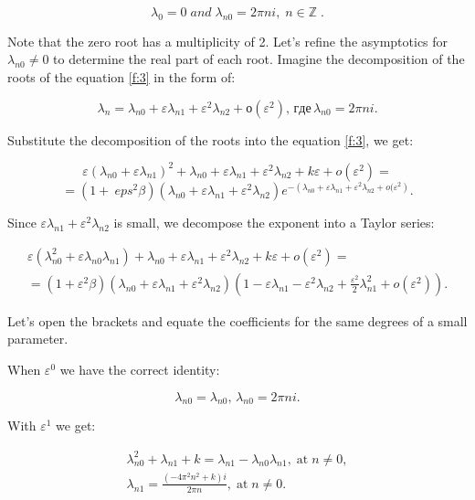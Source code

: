 \documentclass[12pt]{article} %
\newcommand{\eps}{\varepsilon}
\begin{document}
\[
\lambda_{0}=0\;and\;\lambda_{n0}=2\pi ni,\;n\in\mathbb{Z}\;.
\]

Note that the zero root has a multiplicity of 2. Let's refine the asymptotics for $\lambda_{n0}\neq0$ to determine the real part of each root. Imagine the decomposition of the roots of the equation \eqref{f:3} in the form of:

\[
\lambda_n=\lambda_{n0}+ \varepsilon\lambda_{n1}+\varepsilon^{2}\lambda_{n2}+о(\varepsilon^{2}),\, где\, \lambda_{n0}=2\pi n i.
\]

Substitute the decomposition of the roots into the equation \eqref{f:3}, we get:

\[
\eps\left(\lambda_{n0}+ \varepsilon\lambda_{n1}\right)^{2}+\lambda_{n0}+ \varepsilon\lambda_{n1}+\varepsilon^{2}\lambda_{n2}+k\varepsilon+ o(\varepsilon^{2})= 
\]
\[
= (1+\ eps^2\beta)\left(\lambda_{n0}+ \varepsilon\lambda_{n1}+\varepsilon^{2}\lambda_{n2}\right) e^{-\left(\lambda_{n0}+\varepsilon\lambda_{n1}+\varepsilon^{2}\lambda_{n2}+o(\varepsilon^{2 }\right) }.
\]

Since \(\varepsilon\lambda_{n1}+\varepsilon^{2}\lambda_{n2}\) is small, we decompose the exponent into a Taylor series:

\begin{equation}
\begin{array}{cc}
\varepsilon\left(\lambda_{n0}^{2}+\varepsilon\lambda_{n0}\lambda_{n1}\right)+\lambda_{n0}+\varepsilon\lambda_{n1}+\varepsilon^{2}\lambda_{n2}+k\varepsilon+ o(\varepsilon^{2})=\\
=(1+\eps^2\beta)\left(\lambda_{n0}+ \varepsilon\lambda_{n1}+\varepsilon^{2}\lambda_{n2}\right)
\left(1-\varepsilon\lambda_{n1}-\varepsilon^{2}\lambda_{n2}+\frac{\varepsilon^{2}}{2}\lambda_{n1}^{2}+ o(\varepsilon^{2})\right).
\end{array}
\label{f:6}
\end{equation}

Let's open the brackets and equate the coefficients for the same degrees of a small parameter.

When \(\varepsilon^{0}\) we have the correct identity:

\[
\lambda_{n0}=\lambda_{n0},\,
\lambda_{n0}=2\pi n i.
\]

With \(\varepsilon^{1}\) we get:

\begin{equation}
\begin{array}{cc}
\lambda_{n0}^{2}+\lambda_{n1}+k=
\lambda_{n1}-\lambda_{n0}\lambda_{n1},\;\text{at}\;n\neq0,\\
\lambda_{n1}=\displaystyle\frac{\left(-4\pi^{2}n^{2}+k\right)i}{2\pi n},\;\text{at}\;n\neq0.
\end{array}
\label{f:7}
\end{equation}
\end{document}
